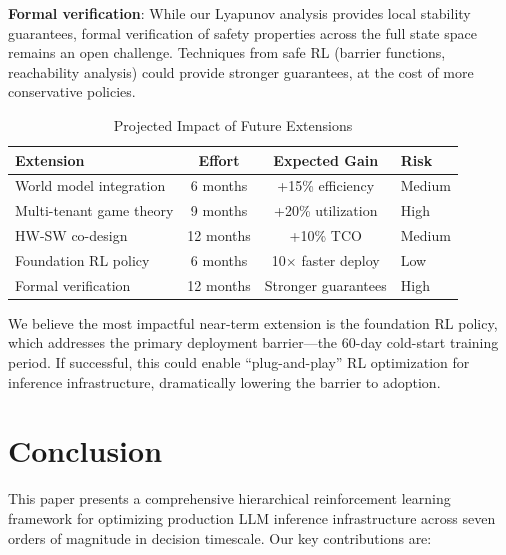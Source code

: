 \documentclass[conference,10pt]{IEEEtran}
\begin{document}
\textbf{Formal verification}: While our Lyapunov analysis provides local stability guarantees, formal verification of safety properties across the full state space remains an open challenge. Techniques from safe RL (barrier functions, reachability analysis) could provide stronger guarantees, at the cost of more conservative policies.

\begin{table}[!htbp]
\caption{Projected Impact of Future Extensions}
\label{tab:future}
\centering\scriptsize
\begin{tabular}{@{}lccl@{}}
\toprule
\textbf{Extension} & \textbf{Effort} & \textbf{Expected Gain} & \textbf{Risk} \\
\midrule
World model integration & 6 months & +15\% efficiency & Medium \\
Multi-tenant game theory & 9 months & +20\% utilization & High \\
HW-SW co-design & 12 months & +10\% TCO & Medium \\
Foundation RL policy & 6 months & 10$\times$ faster deploy & Low \\
Formal verification & 12 months & Stronger guarantees & High \\
\bottomrule
\end{tabular}
\end{table}

We believe the most impactful near-term extension is the foundation RL policy, which addresses the primary deployment barrier---the 60-day cold-start training period. If successful, this could enable ``plug-and-play'' RL optimization for inference infrastructure, dramatically lowering the barrier to adoption.

\section{Conclusion}
\label{sec:conclusion}

This paper presents a comprehensive hierarchical reinforcement learning framework for optimizing production LLM inference infrastructure across seven orders of magnitude in decision timescale. Our key contributions are:
\end{document}
